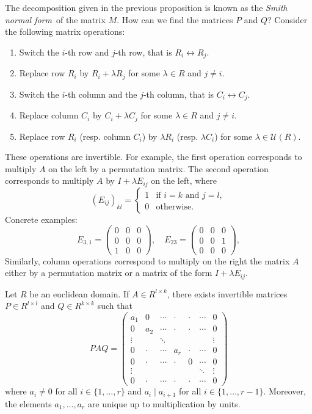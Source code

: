 The decomposition given in the previous proposition is known as 
the \emph{Smith normal form} of the matrix $M$. 
How can we find the matrices $P$ and $Q$? 
Consider the following matrix operations: 
\begin{enumerate}
	\item Switch the $i$-th row and $j$-th row, that is $R_i\leftrightarrow R_j$.
	\item Replace row $R_i$ by $R_i+\lambda R_j$ for some $\lambda\in R$ and $j\ne i$.
	\item Switch the $i$-th column and the $j$-th column, that is $C_i\leftrightarrow C_j$.
	\item Replace column $C_i$ by $C_i+\lambda C_j$ for some $\lambda\in R$ and $j\ne i$. 
	\item Replace row $R_i$ (resp. column $C_i$) by $\lambda R_i$ (resp. $\lambda C_i$) 
	for some $\lambda\in\mathcal{U}(R)$. 
\end{enumerate}
These operations are invertible. For example, the first operation
corresponds to multiply $A$ on the left by a permutation matrix. 
The second
operation corresponds to multiply $A$ by $I+\lambda E_{ij}$ on the left, 
where 
\[
(E_{ij})_{kl}=\begin{cases}
1 & \text{if $i=k$ and $j=l$},\\
0 & \text{otherwise}.	
\end{cases}
\]
Concrete examples:
\[
E_{3,1}=
\begin{pmatrix}
    0 & 0 & 0\\
    0 & 0 & 0\\
    1 & 0 & 0
\end{pmatrix},
\quad
E_{23}=\begin{pmatrix}
    0 & 0 & 0\\
    0 & 0 & 1\\
    0 & 0 & 0
\end{pmatrix},
\]
Similarly, column operations correspond to multiply on the right the matrix $A$
either by a permutation matrix or a matrix of the form $I+\lambda E_{ij}$. 

\begin{theorem}
Let $R$ be an euclidean domain. If $A\in R^{l\times k}$,  
there exists invertible matrices $P\in R^{l\times l}$ and $Q\in R^{k\times k}$ such that 
\[
PAQ=\begin{pmatrix}
a_1 & 0 & \cdots & \cdot & \cdot & \cdots & 0\\
0 & a_2 & \cdots & \cdot & \cdot & \cdots & 0\\
\vdots && \ddots &  & & & \vdots\\	
0 & \cdot & \cdots & a_r & \cdot & \cdots & 0\\	
0 & \cdot & \cdots & \cdot & 0 & \cdots & 0\\	
\vdots &&&&&\ddots &\vdots\\
0 & \cdot & \cdots & \cdot & \cdot & \cdots & 0
\end{pmatrix}
\]
where $a_i\ne0$ for all $i\in\{1,\dots,r\}$ and $a_i\mid a_{i+1}$ for all $i\in\{1,\dots,r-1\}$.
Moreover, the elements $a_1,\dots,a_r$ are unique up to multiplication by
units. 
\end{theorem}

